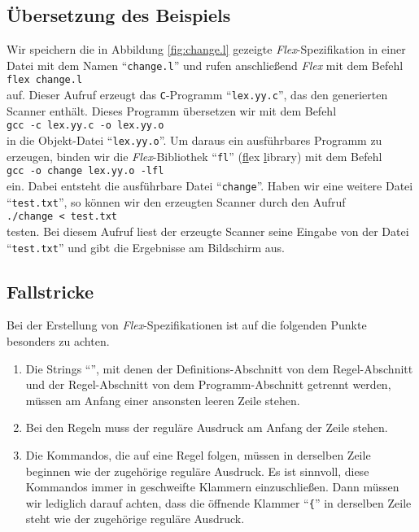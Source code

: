 \subsection{\"Ubersetzung des Beispiels}
Wir speichern die in Abbildung \ref{fig:change.l} gezeigte \textsl{Flex}-Spezifikation in einer
Datei mit dem Namen ``\texttt{change.l}'' und rufen anschlie{\ss}end \textsl{Flex}\/ mit dem Befehl
\\[0.2cm]
\hspace*{1.3cm} \texttt{flex change.l}
\\[0.2cm]
auf.  Dieser Aufruf erzeugt das \texttt{C}-Programm ``\texttt{lex.yy.c}'', das den generierten
Scanner enth\"alt.  Dieses Programm \"ubersetzen wir mit dem Befehl
\\[0.2cm]
\hspace*{1.3cm} \texttt{gcc -c lex.yy.c -o lex.yy.o}
\\[0.2cm]
in die Objekt-Datei ``\texttt{lex.yy.o}''.  Um daraus ein ausf\"uhrbares Programm zu erzeugen, binden
wir die \textsl{Flex}-Bibliothek ``\texttt{fl}'' (\underline{f}lex \underline{l}ibrary) mit dem
Befehl
\\[0.2cm]
\hspace*{1.3cm} \texttt{gcc -o change lex.yy.o -lfl}
\\[0.2cm]
ein.  Dabei entsteht die ausf\"uhrbare Datei ``\texttt{change}''.  Haben wir eine weitere Datei
``\texttt{test.txt}'', so k\"onnen wir den erzeugten Scanner durch den Aufruf
\\[0.2cm]
\hspace*{1.3cm} \texttt{./change < test.txt}
\\[0.2cm]
testen.  Bei diesem Aufruf liest der erzeugte Scanner seine Eingabe von der Datei ``\texttt{test.txt}''
und gibt die Ergebnisse am Bildschirm aus.

\subsection{Fallstricke}
Bei der Erstellung von \textsl{Flex}-Spezifikationen ist auf die folgenden Punkte besonders zu
achten. 
\begin{enumerate}
\item Die Strings ``\texttt{}'', mit denen der Definitions-Abschnitt von dem 
      Regel-Abschnitt und der Regel-Abschnitt von dem Programm-Abschnitt getrennt werden, m\"ussen am
      Anfang einer ansonsten leeren Zeile stehen.
\item Bei den Regeln muss der regul\"are Ausdruck am Anfang der Zeile stehen.
\item Die Kommandos, die auf eine Regel folgen, m\"ussen in derselben Zeile beginnen wie der
      zugeh\"orige regul\"are Ausdruck.  Es ist sinnvoll, diese Kommandos immer in
      geschweifte Klammern einzuschlie{\ss}en.  Dann m\"ussen wir lediglich darauf achten, dass
      die \"offnende Klammer ``\texttt{\{}'' in derselben Zeile steht wie der zugeh\"orige 
      regul\"are Ausdruck.  
\end{enumerate}


